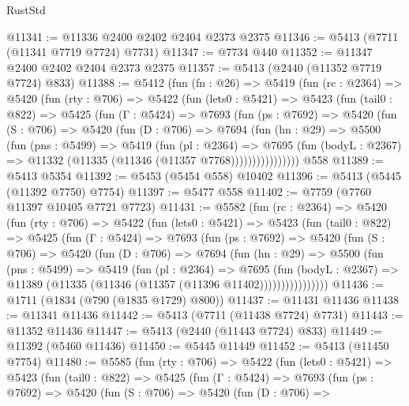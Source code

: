 \begin{lexlean}{RustStd}
\begin{coremodule}
@11341 := @11336 @2400 @2402 @2404 @2373 @2375
@11346 := @5413 (@7711 (@11341 @7719 @7724) @7731)
@11347 := @7734 @440
@11352 := @11347 @2400 @2402 @2404 @2373 @2375
@11357 := @5413 (@2440 (@11352 @7719 @7724) @833)
@11388 := @5412
    (fun (fn : @26) =>
    @5419
      (fun (rc : @2364) =>
      @5420
        (fun (rty : @706) =>
        @5422
          (fun (lets0 : @5421) =>
          @5423
            (fun (tail0 : @822) =>
            @5425
              (fun (Γ : @5424) =>
              @7693
                (fun (ps : @7692) =>
                @5420
                  (fun (S : @706) =>
                  @5420
                    (fun (D : @706) =>
                    @7694
                      (fun (hn : @29) =>
                      @5500
                        (fun (pns : @5499) =>
                        @5419
                          (fun (pl : @2364) =>
                          @7695
                            (fun (bodyL : @2367) =>
                            @11332 (@11335 (@11346 (@11357 @7768))))))))))))))))
    @558
@11389 := @5413 @5354
@11392 := @5453 (@5454 @558) @10402
@11396 := @5413 (@5445 (@11392 @7750) @7754)
@11397 := @5477 @558
@11402 := @7759 (@7760 @11397 @10405 @7721 @7723)
@11431 := @5582
    (fun (rc : @2364) =>
    @5420
      (fun (rty : @706) =>
      @5422
        (fun (lets0 : @5421) =>
        @5423
          (fun (tail0 : @822) =>
          @5425
            (fun (Γ : @5424) =>
            @7693
              (fun (ps : @7692) =>
              @5420
                (fun (S : @706) =>
                @5420
                  (fun (D : @706) =>
                  @7694
                    (fun (hn : @29) =>
                    @5500
                      (fun (pns : @5499) =>
                      @5419
                        (fun (pl : @2364) =>
                        @7695
                          (fun (bodyL : @2367) =>
                          @11389 (@11335 (@11346 (@11357 (@11396 @11402))))))))))))))))
@11436 := @1711 (@1834 (@790 (@1835 @1729) @800))
@11437 := @11431 @11436
@11438 := @11341 @11436
@11442 := @5413 (@7711 (@11438 @7724) @7731)
@11443 := @11352 @11436
@11447 := @5413 (@2440 (@11443 @7724) @833)
@11449 := @11392 (@5460 @11436)
@11450 := @5445 @11449
@11452 := @5413 (@11450 @7754)
@11480 := @5585
    (fun (rty : @706) =>
    @5422
      (fun (lets0 : @5421) =>
      @5423
        (fun (tail0 : @822) =>
        @5425
          (fun (Γ : @5424) =>
          @7693
            (fun (ps : @7692) =>
            @5420
              (fun (S : @706) =>
              @5420
                (fun (D : @706) =>

\end{coremodule}
\end{lexlean}
